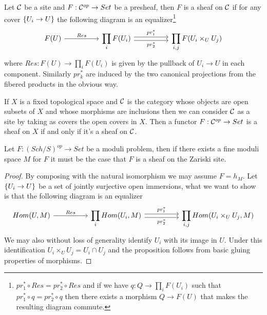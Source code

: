 \begin{definition}
Let $\mathcal{C}$ be a site and $F:\mathcal{C}^{op}\to Set$ be a presheaf, then $F$ is a sheaf on $\mathcal{C}$ if for any cover $\left\{{U_i\to U}\right\}$ the following diagram is an equalizer\footnote{$pr_1^\ast\circ Res=pr_2^\ast\circ Res$ and if we have $q:Q\to \prod_i F(U_i)$ such that $pr_1^\ast\circ q=pr_2^\ast\circ q$ then there exists a morphism $Q\to F(U)$ that makes the resulting diagram commute.}
\[\begin{tikzcd}
	{F(U)} && {\displaystyle \prod_iF(U_i)} && {\displaystyle \prod_{i,j}F(U_i\times_UU_j)}
	\arrow["Res", from=1-1, to=1-3]
	\arrow["{pr_1^\ast}", shift left, from=1-3, to=1-5]
	\arrow["{pr_2^\ast}"', shift right, from=1-3, to=1-5]
\end{tikzcd}\]
where $Res:F(U)\to \prod_i F(U_i)$ is given by the pullback of $U_i\to U$ in each component. Similarly $pr_k^\ast$ are induced by the two canonical projections from the fibered products in the obvious way.
\end{definition}
\begin{remark}
If $X$ is a fixed topological space and $\mathcal{C}$ is the category whose objects are open subsets of $X$ and whose morphisms are inclusions then we can consider $\mathcal{C}$ as a site by taking as covers the open covers in $X$. Then a functor $F:\mathcal{C}^{op}\to Set$ is a sheaf on $X$ if and only if it's a sheaf on $\mathcal{C}$.
\end{remark}

\begin{proposition}
Let $F:(Sch/S)^{op}\to Set$ be a moduli problem, then if there exists a fine moduli space $M$ for $F$ it must be the case that $F$ is a sheaf on the Zariski site.
\end{proposition}
\begin{proof}
By composing with the natural isomorphism we may assume $F=h_M$. Let $\left\{{U_i\to U}\right\}$ be a set of jointly surjective open immersions, what we want to show is that the following diagram is an equalizer
\[\begin{tikzcd}
	{Hom(U,M)} && {\displaystyle \prod_i Hom(U_i,M)} && {\displaystyle \prod_{i,j}Hom(U_i\times_UU_j,M)}
	\arrow["Res", from=1-1, to=1-3]
	\arrow["{pr_1^\ast}", shift left, from=1-3, to=1-5]
	\arrow["{pr_2^\ast}"', shift right, from=1-3, to=1-5]
\end{tikzcd}\]
We may also without loss of generality identify $U_i$ with its image in $U$. Under this identification $U_i\times_U U_j=U_i\cap U_j$ and the proposition follows from basic gluing properties of morphisms.
\end{proof}
